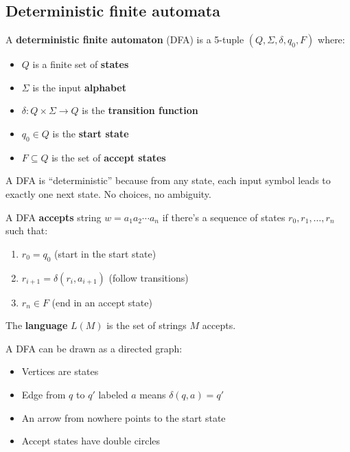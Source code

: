 \subsection*{Deterministic finite automata}

\begin{definition}[DFA]
A \textbf{deterministic finite automaton} (DFA) is a 5-tuple $(Q, \Sigma, \delta, q_0, F)$ where:
\begin{itemize}
  \item $Q$ is a finite set of \textbf{states}
  \item $\Sigma$ is the input \textbf{alphabet}
  \item $\delta: Q \times \Sigma \to Q$ is the \textbf{transition function}
  \item $q_0 \in Q$ is the \textbf{start state}
  \item $F \subseteq Q$ is the set of \textbf{accept states}
\end{itemize}
\end{definition}

A DFA is ``deterministic'' because from any state, each input symbol leads to exactly one next state. No choices, no ambiguity.

\begin{definition}
A DFA \textbf{accepts} string $w = a_1 a_2 \cdots a_n$ if there's a sequence of states $r_0, r_1, \ldots, r_n$ such that:
\begin{enumerate}
  \item $r_0 = q_0$ (start in the start state)
  \item $r_{i+1} = \delta(r_i, a_{i+1})$ (follow transitions)
  \item $r_n \in F$ (end in an accept state)
\end{enumerate}
The \textbf{language} $L(M)$ is the set of strings $M$ accepts.
\end{definition}

\begin{definition}
A DFA can be drawn as a directed graph:
\begin{itemize}
  \item Vertices are states
  \item Edge from $q$ to $q'$ labeled $a$ means $\delta(q, a) = q'$
  \item An arrow from nowhere points to the start state
  \item Accept states have double circles
\end{itemize}
\end{definition}

